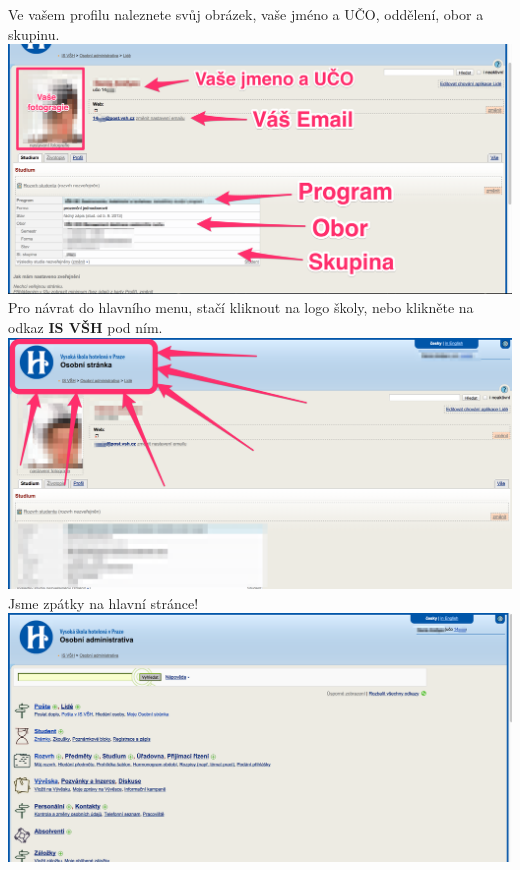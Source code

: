 \documentclass[a4paper,12pt]{article}
\begin{document}
Ve vašem profilu naleznete svůj obrázek, vaše jméno a UČO, oddělení, obor a skupinu. \\

\includegraphics[width=\textwidth]{s06-1} \\

\newpage
Pro návrat do hlavního menu, stačí kliknout na logo školy, 
nebo klikněte na odkaz \textbf{IS VŠH} pod ním. \\

\includegraphics[width=\textwidth]{s07} \\

Jsme zpátky na hlavní stránce! \\

\includegraphics[width=\textwidth]{s04} \\
\end{document}

